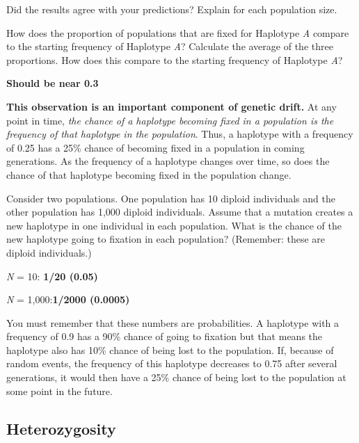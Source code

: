 \documentclass[11pt, addpoints, hidelinks]{exam}
\begin{document}
\begin{questions}
\question[2] Did the results agree with your predictions? Explain for
each population size.

\newpage

\question[1] How does the proportion of populations that are fixed for
Haplotype \emph{A} compare to the starting frequency of Haplotype
\emph{A}? Calculate the average of the three proportions. How does this
compare to the starting frequency of Haplotype \emph{A}?


\begin{minipage}[t][2.5cm]{\textwidth}
	\ifprintanswers
		\textbf{Should be near 0.3}
	\fi
\end{minipage}


\textbf{This observation is an important component of genetic drift.} At any
point in time, \emph{the chance of a haplotype becoming fixed in a
population is the frequency of that haplotype in the population}. Thus,
a haplotype with a frequency of 0.25 has a 25\% chance of becoming fixed
in a population in coming generations. As the frequency of a haplotype
changes over time, so does the chance of that haplotype becoming fixed
in the population change.



\question[1] Consider two populations. One population has 10 diploid
individuals and the other population has 1,000 diploid individuals.
Assume that a mutation creates a new haplotype in one individual in each
population. What is the chance of the new haplotype going to fixation in
each population? (Remember: these are diploid individuals.)

\bigskip

\emph{N} = 10: \ifprintanswers \textbf{1/20 (0.05)} \fi \bigskip

\emph{N} = 1,000:\ifprintanswers \textbf{1/2000 (0.0005)} \fi \bigskip


You must remember that these numbers are probabilities. A haplotype with
a frequency of 0.9 has a 90\% chance of going to fixation but that means
the haplotype also has 10\% chance of being lost to the population. If,
because of random events, the frequency of this haplotype decreases to
0.75 after several generations, it would then have a 25\% chance of
being lost to the population at some point in the future.

\bigskip

\subsection*{Heterozygosity}


\end{questions}
\end{document}
